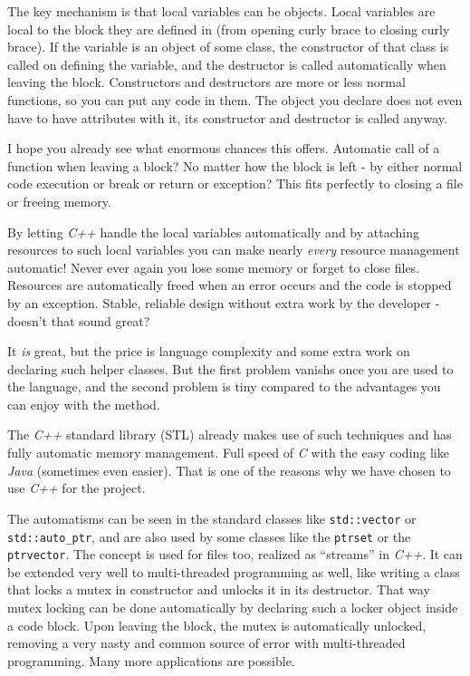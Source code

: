 \documentclass{report}
\begin{document}
The key mechanism is that local variables can be objects. Local
variables are local to the block they are defined in (from opening curly
brace to closing curly brace). If the variable is an object of some
class, the constructor of that class is called on defining the variable,
and the destructor is called automatically when leaving the block.
Constructors and destructors are more or less normal functions, so you
can put any code in them. The object you declare does not even have to
have attributes with it, its constructor and destructor is called
anyway.

I hope you already see what enormous chances this offers. Automatic call
of a function when leaving a block? No matter how the block is left - by
either normal code execution or break or return or exception? This fits
perfectly to closing a file or freeing memory.

By letting \emph{C++} handle the local variables automatically and by
attaching resources to such local variables you can make nearly
\emph{every} resource management automatic! Never ever again you lose
some memory or forget to close files. Resources are automatically freed
when an error occurs and the code is stopped by an exception. Stable,
reliable design without extra work by the developer - doesn't that sound
great?

It \emph{is} great, but the price is language complexity and some extra
work on declaring such helper classes. But the first problem vanishs
once you are used to the language, and the second problem is tiny
compared to the advantages you can enjoy with the method.

The \emph{C++} standard library (STL) already makes use of such
techniques and has fully automatic memory management. Full speed of
\emph{C} with the easy coding like \emph{Java} (sometimes even easier).
That is one of the reasons why we have chosen to use \emph{C++} for the
project.

The automatisms can be seen in the standard classes like
\texttt{std::vector} or \texttt{std::auto\_ptr}, and are also used by
some \dftd classes like the \texttt{ptrset} or the \texttt{ptrvector}.
The concept is used for files too, realized as ``streams'' in
\emph{C++}. It can be extended very well to multi-threaded programming
as well, like writing a class that locks a mutex in constructor and
unlocks it in its destructor. That way mutex locking can be done
automatically by declaring such a locker object inside a code block.
Upon leaving the block, the mutex is automatically unlocked, removing a
very nasty and common source of error with multi-threaded programming.
Many more applications are possible.
\end{document}
